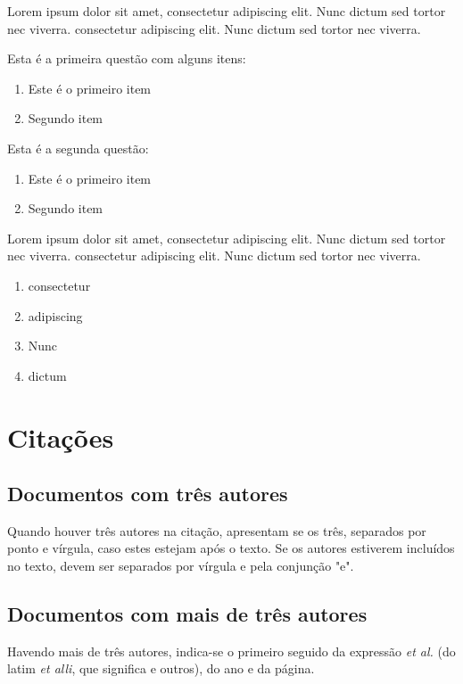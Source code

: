Lorem ipsum dolor sit amet, consectetur adipiscing elit. Nunc dictum sed tortor nec viverra. consectetur adipiscing elit. Nunc dictum sed tortor nec viverra.

\begin{questao}
	\item Esta é a primeira questão com alguns itens:
		\begin{enumerate}
			\item Este é o primeiro item
			\item Segundo item
		\end{enumerate}
	\item Esta é a segunda questão:
		\begin{enumerate}
			\item Este é o primeiro item
			\item Segundo item
		\end{enumerate}
	\item Lorem ipsum dolor sit amet, consectetur adipiscing elit. Nunc dictum sed tortor nec viverra. consectetur adipiscing elit. Nunc dictum sed tortor nec viverra.
		\begin{enumerate}
			\item consectetur
			\item adipiscing
			\item Nunc
			\item dictum
		\end{enumerate}
\end{questao}

\section{Citações}

\subsection{Documentos com três autores}

Quando houver três autores na citação, apresentam se os três, separados por ponto e vírgula, caso estes estejam após o texto. Se os autores estiverem incluídos no texto, devem ser separados por vírgula e pela conjunção "e".


\cite{tresautores}

\subsection{Documentos com mais de três autores}
Havendo mais de três autores, indica-se o primeiro seguido da expressão \textit{et al.} (do latim \textit{et alli}, que significa e outros), do ano e da página.

